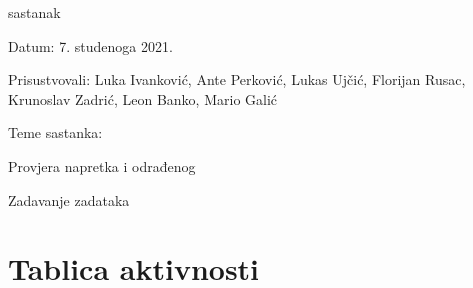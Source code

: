 \begin{packed_enum}
			\item  sastanak
			\item[] \begin{packed_item}
				\item Datum: 7. studenoga 2021.
				\item Prisustvovali: Luka Ivanković, Ante Perković, Lukas Ujčić, Florijan Rusac, Krunoslav Zadrić, Leon Banko, Mario Galić 
				\item Teme sastanka:
				\begin{packed_item}
					\item  Provjera napretka i odrađenog
					\item Zadavanje zadataka
				\end{packed_item}
			\end{packed_item}
			
			
		\end{packed_enum}
		
		\eject
		\section*{Tablica aktivnosti}
		

			



